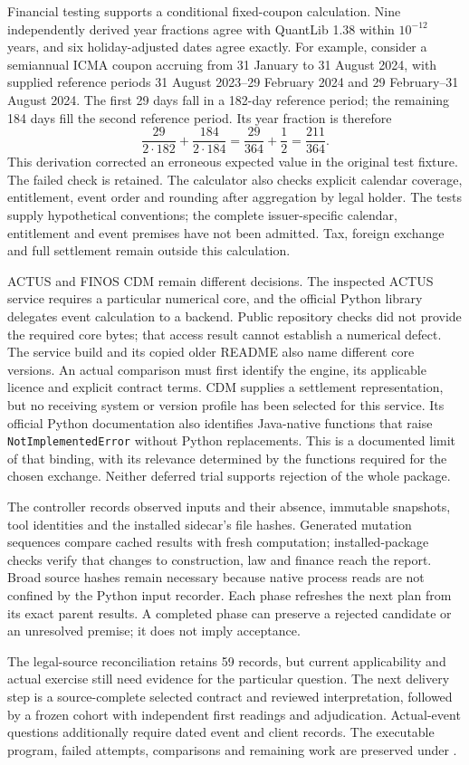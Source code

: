 \begingroup
{}
Financial testing supports a conditional fixed-coupon calculation. Nine
independently derived year fractions agree with QuantLib 1.38 within
$10^{-12}$ years, and six holiday-adjusted dates agree exactly. For example,
consider a semiannual ICMA coupon accruing from 31 January to 31 August 2024,
with supplied reference periods 31 August 2023--29 February 2024 and
29 February--31 August 2024. The first 29 days fall in a 182-day reference
period; the remaining 184 days fill the second reference period. Its year
fraction is therefore
\[
 \frac{29}{2\cdot182}+\frac{184}{2\cdot184}
 =\frac{29}{364}+\frac12=\frac{211}{364}.
\]
This derivation corrected an erroneous expected value in the original test
fixture. The failed check is retained. The calculator also checks explicit
calendar coverage, entitlement, event order and rounding after aggregation by
legal holder. The tests supply hypothetical conventions; the complete
issuer-specific calendar, entitlement and event premises have not been admitted.
Tax, foreign exchange and full settlement remain outside this calculation.
\par\endgroup

ACTUS and FINOS CDM remain different decisions. The inspected ACTUS service
requires a particular numerical core, and the official Python library delegates
event calculation to a backend. Public repository checks did not provide the
required core bytes; that access result cannot establish a numerical defect.
The service build and its copied older README also name different core versions.
An actual comparison must first identify the engine, its applicable licence and
explicit contract terms. CDM supplies a settlement representation, but no receiving
system or version profile has been selected for this service. Its official Python
documentation also identifies Java-native functions that raise
\texttt{NotImplementedError} without Python replacements. This is a documented
limit of that binding, with its relevance determined by the functions required
for the chosen exchange. Neither deferred trial supports rejection of the whole
package.

The controller records observed inputs and their absence, immutable snapshots,
tool identities and the installed sidecar's file hashes. Generated mutation
sequences compare cached results with fresh computation; installed-package
checks verify that changes to construction, law and finance reach the report.
Broad source hashes remain necessary because native process reads are not
confined by the Python input recorder. Each phase refreshes the next plan from
its exact parent results. A completed phase can preserve a rejected candidate
or an unresolved premise; it does not imply acceptance.

The legal-source reconciliation retains 59 records, but current applicability
and actual exercise still need evidence for the particular question. The next
delivery step is a source-complete selected contract and reviewed interpretation,
followed by a frozen cohort with independent first readings and adjudication.
Actual-event questions additionally require dated event and client records.
The executable program, failed attempts, comparisons and remaining work are
preserved under .
